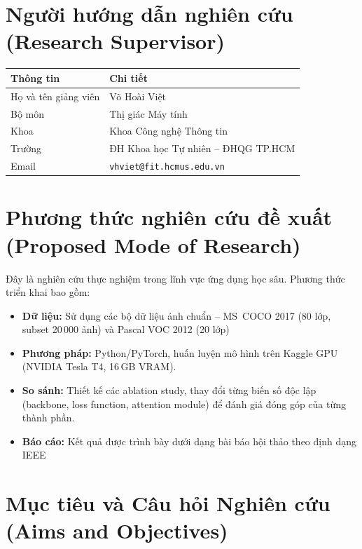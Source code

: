 \documentclass{article}
\begin{document}
\section{Người hướng dẫn nghiên cứu (Research Supervisor)}

\begin{table}[H]
  \centering
  \begin{tabular}{ll}
    \toprule
    \textbf{Thông tin} & \textbf{Chi tiết} \\
    \midrule
    Họ và tên giảng viên & Võ Hoài Việt \\
    Bộ môn & Thị giác Máy tính \\
    Khoa & Khoa Công nghệ Thông tin \\
    Trường & ĐH Khoa học Tự nhiên -- ĐHQG TP.HCM \\
    Email & \texttt{vhviet@fit.hcmus.edu.vn} \\
    \bottomrule
  \end{tabular}
\end{table}

\section{Phương thức nghiên cứu đề xuất (Proposed Mode of Research)}

Đây là nghiên cứu thực nghiệm
trong lĩnh vực ứng dụng học sâu.
Phương thức triển khai bao gồm:

\begin{itemize}[leftmargin=1.8em]
  \item \textbf{Dữ liệu:} Sử dụng các bộ dữ liệu ảnh chuẩn --
        MS~COCO 2017 (80 lớp, subset 20\,000 ảnh) và Pascal VOC 2012 (20 lớp)
  \item \textbf{Phương pháp:} Python/PyTorch, huấn luyện mô hình
        trên Kaggle GPU (NVIDIA Tesla T4, 16\,GB VRAM).
  \item \textbf{So sánh:} Thiết kế các ablation study, thay đổi
        từng biến số độc lập (backbone, loss function, attention module) để đánh giá đóng góp của từng thành phần.
  \item \textbf{Báo cáo:} Kết quả được trình bày dưới dạng bài báo hội thảo theo
        định dạng IEEE
\end{itemize}
\section{Mục tiêu và Câu hỏi Nghiên cứu (Aims and Objectives)}
\end{document}
